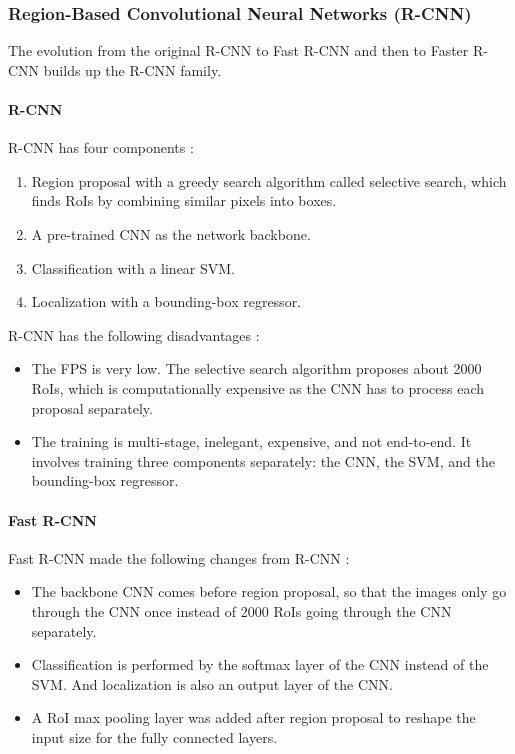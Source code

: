 \documentclass[a4paper, 11pt, oneside]{article}
\begin{document}
\subsubsection{Region-Based Convolutional Neural Networks (R-CNN)}

The evolution from the original R-CNN \cite{girshick2014rich} to Fast R-CNN \cite{girshick2015fast} and then to
Faster R-CNN \cite{ren2015faster} builds up the R-CNN family.

\paragraph{R-CNN}

R-CNN has four components \cite{elgendy2020deep, girshick2014rich}:

\begin{enumerate}
  \item Region proposal with a greedy search algorithm called selective search, which finds RoIs by combining similar
  pixels into boxes.
  \item A pre-trained CNN as the network backbone.
  \item Classification with a linear SVM.
  \item Localization with a bounding-box regressor.
\end{enumerate}

R-CNN has the following disadvantages \cite{elgendy2020deep, girshick2014rich, girshick2015fast}:

\begin{itemize}
  \item The FPS is very low. The selective search algorithm proposes about 2000 RoIs, which is computationally
  expensive as the CNN has to process each proposal separately.
  \item The training is multi-stage, inelegant, expensive, and not end-to-end. It involves training three components
  separately: the CNN, the SVM, and the bounding-box regressor.
\end{itemize}

\paragraph{Fast R-CNN}

Fast R-CNN made the following changes from R-CNN \cite{elgendy2020deep, girshick2015fast}:

\begin{itemize}
  \item The backbone CNN comes before region proposal, so that the images only go through the CNN once instead
  of 2000 RoIs going through the CNN separately.
  \item Classification is performed by the softmax layer of the CNN instead of the SVM. And localization is also an output
  layer of the CNN.
  \item A RoI max pooling layer was added after region proposal to reshape the input size for the fully connected layers.
\end{itemize}
\end{document}
